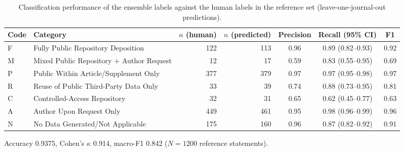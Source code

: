 \begin{table}[htbp]
\centering
\caption{Classification performance of the ensemble labels against the human labels in the reference set (leave-one-journal-out predictions).}
\label{tab:classifier_performance_lojo}
\small
\begin{tabular}{llrrccc}
\toprule
Code & Category & $n$ (human) & $n$ (predicted) & Precision & Recall (95\% CI) & F1 \\
\midrule
F & Fully Public Repository Deposition & 122 & 113 & 0.96 & 0.89 (0.82--0.93) & 0.92 \\
M & Mixed Public Repository + Author Request & 12 & 17 & 0.59 & 0.83 (0.55--0.95) & 0.69 \\
P & Public Within Article/Supplement Only & 377 & 379 & 0.97 & 0.97 (0.95--0.98) & 0.97 \\
R & Reuse of Public Third-Party Data Only & 33 & 39 & 0.74 & 0.88 (0.73--0.95) & 0.81 \\
C & Controlled-Access Repository & 32 & 31 & 0.65 & 0.62 (0.45--0.77) & 0.63 \\
A & Author Upon Request Only & 449 & 461 & 0.95 & 0.98 (0.96--0.99) & 0.96 \\
N & No Data Generated/Not Applicable & 175 & 160 & 0.96 & 0.87 (0.82--0.92) & 0.91 \\
\bottomrule
\end{tabular}
\par\smallskip
\footnotesize Accuracy 0.9375, Cohen's $\kappa$ 0.914, macro-F1 0.842 ($N=1200$ reference statements).
\end{table}
